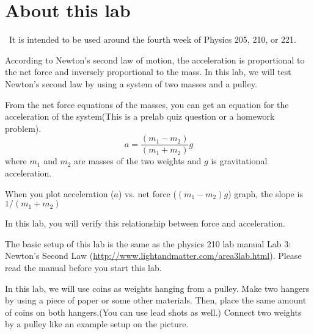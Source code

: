 
\renewcommand\thechapter{c1.4c}
\label{lab:covid-2nd-law}

\section*{About this lab}

\covid\ 
It is intended to be used around the fourth week of Physics 205, 210, or 221.

\apparatus
{}

\begin{goals}

\item[] According to Newton's second law of motion, the acceleration is proportional to the net force and inversely proportional to the mass. 
In this lab, we will test Newton's second law by using a system of two masses and a pulley. 
\end{goals}

\introduction

From the net force equations of the masses, you can get an equation for the acceleration of the system(This is a prelab quiz question or a homework problem). 
\begin{equation*}
a = \dfrac{\left(m_1-m_2\right)}{\left(m_1+m_2\right)} g
\end{equation*}
where $m_1$ and $m_2$ are masses of the two weights and $g$ is gravitational acceleration. 

When you plot acceleration ($a$) vs. net force ($\left(m_1 - m_2\right)g$) graph, the slope is $1/\left(m_1+m_2\right)$

In this lab, you will verify this relationship between force and acceleration. 

\observations 
The basic setup of this lab is the same as the physics 210 lab manual Lab 3: Newton's Second Law (\url{http://www.lightandmatter.com/area3lab.html}). Please read the manual before you start this lab. 

In this lab, we will use coins as weights hanging from a pulley. Make two hangers by using a piece of paper or some other materials. Then, place the same amount of coins on both hangers.(You can use lead shots as well.) Connect two weights by a pulley like an example setup on the picture. 

